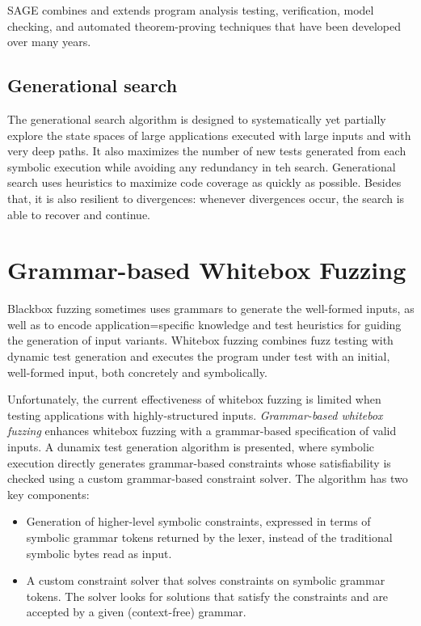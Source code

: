 SAGE combines and extends program analysis testing, verification, model checking, and automated theorem-proving techniques that have been developed over many years.

\subsection{Generational search}
The generational search algorithm is designed to systematically yet partially explore the state spaces of large applications executed with large inputs and with very deep paths.
It also maximizes the number of new tests generated from each symbolic execution while avoiding any redundancy in teh search.
Generational search uses heuristics to maximize code coverage as quickly as possible. Besides that, it is also resilient to divergences: whenever divergences occur, the search is able to recover and continue.

\section{Grammar-based Whitebox Fuzzing}

Blackbox fuzzing sometimes uses grammars to generate the well-formed inputs, as well as to encode application=specific knowledge and test heuristics for guiding the generation of input variants.
Whitebox fuzzing combines fuzz testing with dynamic test generation and executes the program under test with an initial, well-formed input, both concretely and symbolically.

Unfortunately, the current effectiveness of whitebox fuzzing is limited when testing applications with highly-structured inputs.
\textit{Grammar-based whitebox fuzzing} enhances whitebox fuzzing with a grammar-based specification of valid inputs. A dunamix test generation algorithm is presented, where symbolic execution directly generates grammar-based constraints whose satisfiability is checked using a custom grammar-based constraint solver.
The algorithm has two key components:
\begin{itemize}
    \item Generation of higher-level symbolic constraints, expressed in terms of symbolic grammar tokens returned by the lexer, instead of the traditional symbolic bytes read as input.
    \item A custom constraint solver that solves constraints on symbolic grammar tokens. The solver looks for solutions that satisfy the constraints and are accepted by a given (context-free) grammar.
\end{itemize}

